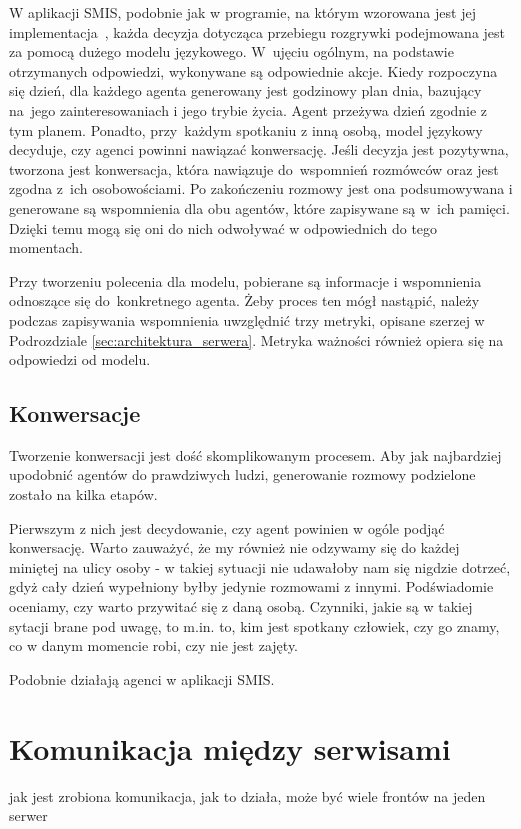 W aplikacji SMIS, podobnie jak w programie, na którym wzorowana jest jej implementacja~\cite{park2023generativeagentsinteractivesimulacra}, każda decyzja dotycząca przebiegu rozgrywki podejmowana jest za pomocą dużego modelu językowego. W~ujęciu ogólnym, na podstawie otrzymanych odpowiedzi, wykonywane są odpowiednie akcje. Kiedy rozpoczyna się dzień, dla każdego agenta generowany jest godzinowy plan dnia, bazujący na~jego zainteresowaniach i jego trybie życia. Agent przeżywa dzień zgodnie z tym planem. Ponadto, przy~każdym spotkaniu z inną osobą, model językowy decyduje, czy agenci powinni nawiązać konwersację. Jeśli decyzja jest pozytywna, tworzona jest konwersacja, która nawiązuje do~wspomnień rozmówców oraz jest zgodna z~ich osobowościami. Po zakończeniu rozmowy jest ona podsumowywana i generowane są wspomnienia dla obu agentów, które zapisywane są w~ich pamięci. Dzięki temu mogą się oni do nich odwoływać w odpowiednich do tego momentach.

Przy tworzeniu polecenia dla modelu, pobierane są informacje i wspomnienia odnoszące się do~konkretnego agenta. Żeby proces ten mógł nastąpić, należy podczas zapisywania wspomnienia uwzględnić trzy metryki, opisane szerzej w Podrozdziale \ref{sec:architektura_serwera}. Metryka ważności również opiera się na odpowiedzi od modelu.

\subsection{Konwersacje}

Tworzenie konwersacji jest dość skomplikowanym procesem. Aby jak najbardziej upodobnić agentów do prawdziwych ludzi, generowanie rozmowy podzielone zostało na kilka etapów.

Pierwszym z nich jest decydowanie, czy agent powinien w ogóle podjąć konwersację. Warto zauważyć, że my również nie odzywamy się do każdej miniętej na ulicy osoby - w takiej sytuacji nie udawałoby nam się nigdzie dotrzeć, gdyż cały dzień wypełniony byłby jedynie rozmowami z innymi. Podświadomie oceniamy, czy warto przywitać się z daną osobą. Czynniki, jakie są w takiej sytacji brane pod uwagę, to m.in. to, kim jest spotkany człowiek, czy go znamy, co w danym momencie robi, czy nie jest zajęty.

Podobnie działają agenci w aplikacji SMIS.




\section{Komunikacja między serwisami}

jak jest zrobiona komunikacja, jak to działa, może być wiele frontów na jeden serwer
